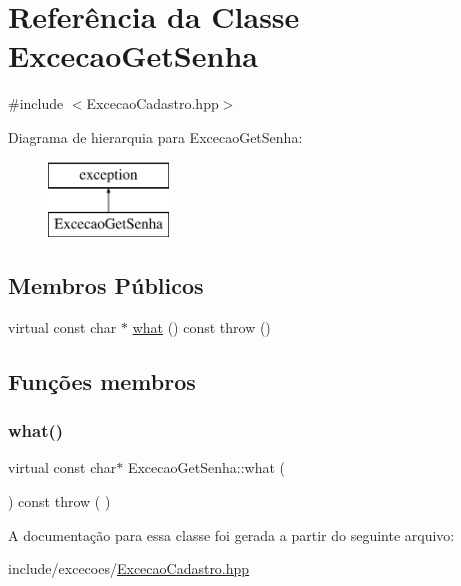 \hypertarget{class_excecao_get_senha}{}\section{Referência da Classe Excecao\+Get\+Senha}
\label{class_excecao_get_senha}


{\ttfamily \#include $<$Excecao\+Cadastro.\+hpp$>$}

Diagrama de hierarquia para Excecao\+Get\+Senha\+:\begin{figure}[H]
\begin{center}
\leavevmode
\includegraphics[height=2.000000cm]{class_excecao_get_senha}
\end{center}
\end{figure}
\subsection*{Membros Públicos}
\begin{DoxyCompactItemize}
\item 
virtual const char $\ast$ \mbox{\hyperlink{class_excecao_get_senha_a00168b3afbe08206dc96a40d05192aa5}{what}} () const  throw ()
\end{DoxyCompactItemize}


\subsection{Funções membros}
\mbox{\label{class_excecao_get_senha_a00168b3afbe08206dc96a40d05192aa5}} 
\subsubsection{\texorpdfstring{what()}{what()}}
{\footnotesize\ttfamily virtual const char$\ast$ Excecao\+Get\+Senha\+::what (\begin{DoxyParamCaption}{ }\end{DoxyParamCaption}) const throw ( ) \hspace{0.3cm}{\ttfamily [virtual]}}



A documentação para essa classe foi gerada a partir do seguinte arquivo\+:\begin{DoxyCompactItemize}
\item 
include/excecoes/\mbox{\hyperlink{_excecao_cadastro_8hpp}{Excecao\+Cadastro.\+hpp}}\end{DoxyCompactItemize}

